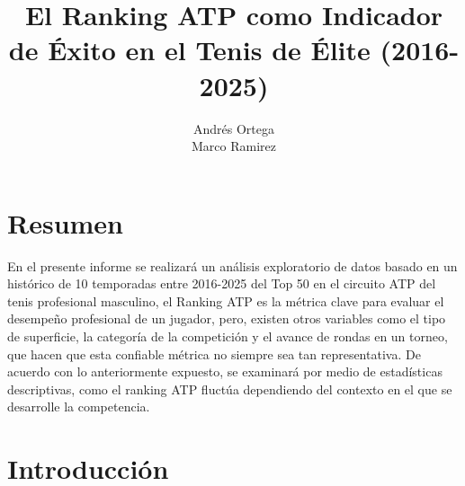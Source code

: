 \documentclass[oneside,11pt]{Latex/Classes/PhDthesisPSnPDF}
\title{El Ranking ATP como Indicador de Éxito en el Tenis de Élite
(2016-2025)}
\author{Andrés Ortega \\ Marco Ramirez}
\begin{document}
\maketitle

\frontmatter


\setcounter{secnumdepth}{3}
\setcounter{tocdepth}{3}

\tableofcontents



\cleardoublepage

  \cleardoublepage       %
  \chapter*{Resumen}     %
  
  En el presente informe se realizará un análisis exploratorio de datos
basado en un histórico de 10 temporadas entre 2016-2025 del Top 50 en el
circuito ATP del tenis profesional masculino, el Ranking ATP es la
métrica clave para evaluar el desempeño profesional de un jugador, pero,
existen otros variables como el tipo de superficie, la categoría de la
competición y el avance de rondas en un torneo, que hacen que esta
confiable métrica no siempre sea tan representativa. De acuerdo con lo
anteriormente expuesto, se examinará por medio de estadísticas
descriptivas, como el ranking ATP fluctúa dependiendo del contexto en el
que se desarrolle la
competencia.             %
  
  \cleardoublepage

\mainmatter
\def\baselinestretch{1.5}

\chapter*{Introducción}
\end{document}

